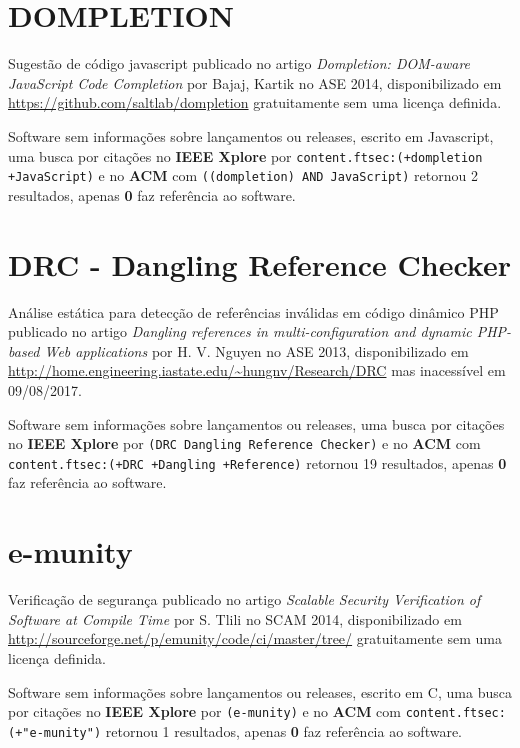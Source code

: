 \section{DOMPLETION}

Sugestão de código javascript
publicado no artigo {\it Dompletion: DOM-aware JavaScript Code Completion}
por Bajaj, Kartik
no ASE 2014,
disponibilizado em \url{https://github.com/saltlab/dompletion}
gratuitamente
sem uma licença definida.

Software sem informações sobre lançamentos ou releases,
escrito em Javascript,
uma busca por citações no {\bf IEEE Xplore} por
\texttt{content.ftsec:(+dompletion +JavaScript)}
e no {\bf ACM} com
\texttt{((dompletion) AND JavaScript)}
retornou
2 resultados, apenas
{\bf 0} faz referência ao software.



\section{DRC - Dangling Reference Checker}

Análise estática para detecção de referências inválidas em código dinâmico PHP
publicado no artigo {\it Dangling references in multi-configuration and dynamic PHP-based Web applications}
por H. V. Nguyen
no ASE 2013,
disponibilizado em \url{http://home.engineering.iastate.edu/~hungnv/Research/DRC}
mas inacessível em 09/08/2017.

Software sem informações sobre lançamentos ou releases,
uma busca por citações no {\bf IEEE Xplore} por
\texttt{(DRC Dangling Reference Checker)}
e no {\bf ACM} com
\texttt{content.ftsec:(+DRC +Dangling +Reference)}
retornou
19 resultados, apenas
{\bf 0} faz referência ao software.



\section{e-munity}

Verificação de segurança
publicado no artigo {\it Scalable Security Verification of Software at Compile Time}
por S. Tlili
no SCAM 2014,
disponibilizado em \url{http://sourceforge.net/p/emunity/code/ci/master/tree/}
gratuitamente
sem uma licença definida.

Software sem informações sobre lançamentos ou releases,
escrito em C,
uma busca por citações no {\bf IEEE Xplore} por
\texttt{(e-munity)}
e no {\bf ACM} com
\texttt{content.ftsec:(+"e-munity")}
retornou
1 resultados, apenas
{\bf 0} faz referência ao software.



